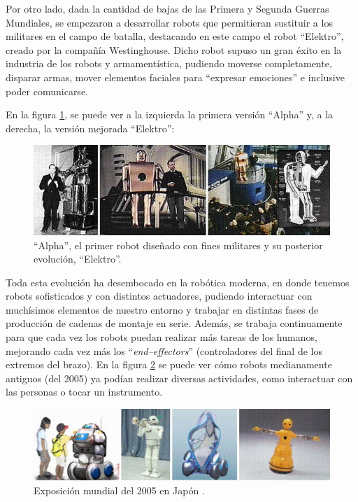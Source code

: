 Por otro lado, dada la cantidad de bajas de las Primera y Segunda Guerras Mundiales, se empezaron a
desarrollar robots que permitieran sustituir a los militares en el campo de batalla, destacando en este
campo el robot ``Elektro'', creado por la compañía Westinghouse. Dicho robot supuso un gran éxito en la
industria de los robots y armamentística, pudiendo moverse completamente, disparar armas, mover elementos
faciales para ``expresar emociones'' e inclusive poder comunicarse.

En la figura \ref{fig:elektro}, se puede ver a la izquierda la primera versión ``Alpha'' y, a la derecha,
la versión mejorada ``Elektro'':

\begin{figure}[H]
    \centering
    \includegraphics[width=.85\linewidth]{pictures/elektro.png}
    \caption{``Alpha'', el primer robot diseñado con fines militares y su posterior evolución, ``Elektro''.}
    \label{fig:elektro}
\end{figure}

Toda esta evolución ha desembocado en la robótica moderna, en donde tenemos robots sofisticados y con
distintos actuadores, pudiendo interactuar con muchísimos elementos de nuestro entorno y trabajar en
distintas fases de producción de cadenas de montaje en serie. Además, se trabaja continuamente para 
que cada vez los robots puedan realizar más tareas de los humanos, mejorando cada vez más los
``\textit{end--effectors}'' (controladores del final de los extremos del brazo). En la figura 
\ref{fig:new_robots} se puede ver cómo robots medianamente antiguos (del 2005) ya podían realizar diversas
actividades, como interactuar con las personas o tocar un instrumento.

\begin{figure}[H]
    \centering
    \includegraphics[width=.75\linewidth]{pictures/expo_japan.png}
    \caption{Exposición mundial del 2005 en Japón \cite{belarminojandmoranmeandfiroozifandcapellosandkolioseandperrottimOrientalCultureRobotics2005a}.}
    \label{fig:new_robots}
\end{figure}

